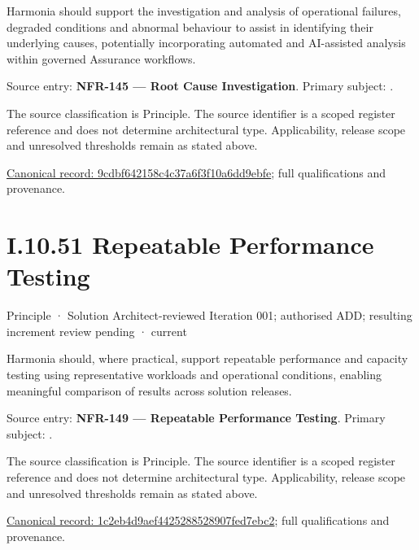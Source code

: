 Harmonia should support the investigation and analysis of operational failures, degraded conditions and abnormal behaviour to assist in identifying their underlying causes, potentially incorporating automated and AI-assisted analysis within governed Assurance workflows.



Source entry: \textbf{NFR-145 — Root Cause Investigation}. Primary subject: \texttt{}.



The source classification is Principle. The source identifier is a scoped register reference and does not determine architectural type. Applicability, release scope and unresolved thresholds remain as stated above.


{\footnotesize \href{../../../../continuum/motivation/principle/9cdbf642158c4c37a6f3f10a6dd9ebfe.md}{Canonical record: 9cdbf642158c4c37a6f3f10a6dd9ebfe}; full qualifications and provenance.}\par
\section*{I.10.51 Repeatable Performance Testing}
\label{navigation:I.10.51}

\label{element:1c2eb4d9aef4425288528907fed7ebc2}
{\small Principle · Solution Architect-reviewed Iteration 001; authorised ADD; resulting increment review pending · current}\par

Harmonia should, where practical, support repeatable performance and capacity testing using representative workloads and operational conditions, enabling meaningful comparison of results across solution releases.



Source entry: \textbf{NFR-149 — Repeatable Performance Testing}. Primary subject: \texttt{}.



The source classification is Principle. The source identifier is a scoped register reference and does not determine architectural type. Applicability, release scope and unresolved thresholds remain as stated above.


{\footnotesize \href{../../../../continuum/motivation/principle/1c2eb4d9aef4425288528907fed7ebc2.md}{Canonical record: 1c2eb4d9aef4425288528907fed7ebc2}; full qualifications and provenance.}\par

